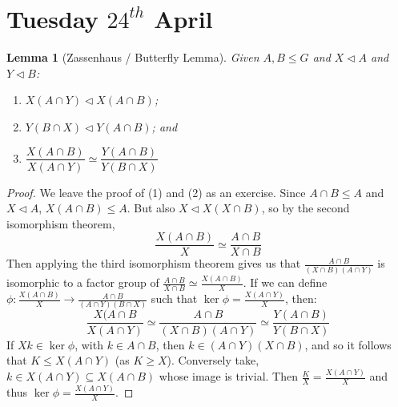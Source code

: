 \documentclass[a4paper,10pt]{article}
\newtheorem{Lem}[thm]{Lemma}
\begin{document}
\newpage
\section{Tuesday $24^{th}$ April}

\begin{Lem}[Zassenhaus / Butterfly Lemma]
Given $A, B \leq G$ and $X \triangleleft A$ and $Y \triangleleft B$: 
\begin{enumerate}
\item $X(A \cap Y) \triangleleft X (A \cap B)$;
\item $Y(B \cap X) \triangleleft Y ( A \cap B)$; and
\item $\dfrac{X (A \cap B)}{X(A \cap Y)} \simeq \dfrac{Y(A\cap B)}{Y(B \cap X)}$
\end{enumerate}
\end{Lem}

\begin{proof}
We leave the proof of (1) and (2) as an exercise. Since $A \cap B \leq A$ and $X \triangleleft A$, $X(A \cap B) \leq A$. But also $X \triangleleft X (X \cap B)$, so by the second isomorphism theorem, 
\[ \frac{X (A \cap B)}{X} \simeq \frac{A \cap B}{X \cap B} \]
Then applying the third isomorphism theorem gives us that $\frac{A \cap B}{(X \cap B)(A \cap Y)}$ is isomorphic to a factor group of $\frac{A \cap B}{X \cap B} \simeq \frac{X (A \cap B)}{X}$. If we can define $\phi : \frac{X(A \cap B)}{X} \rightarrow \frac{A \cap B}{(A \cap Y)(B \cap X)}$ such that $\ker \phi = \frac{X (A \cap Y)}{X}$, then:
\[ \frac{X(A\cap B}{X(A \cap Y)} \simeq \frac{A \cap B}{(X \cap B)(A \cap Y)} \simeq \frac{Y(A \cap B)}{Y(B \cap X)} \]
If $Xk \in \ker \phi$, with $k \in A\cap B$, then $k \in (A \cap Y)(X \cap B)$, and so it follows that $K \leq X(A \cap Y)$ (as $K \geq X$). Conversely take, $k \in X(A \cap Y) \subseteq X(A \cap B)$ whose image is trivial. Then $\frac{K}{X} = \frac{X(A\cap Y)}{X}$ and thus $\ker \phi = \frac{X(A \cap Y)}{X}$. 
\end{proof}
\end{document}
